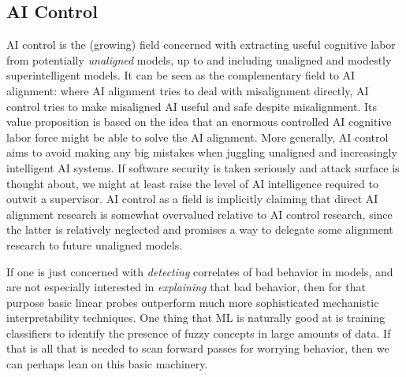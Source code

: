 \subsection{AI Control}
AI control \cite{greenblatt2024aicontrol} is the (growing) field concerned with
extracting useful cognitive labor from potentially \emph{unaligned} models, up
to and including unaligned and modestly superintelligent models. It can be seen
as the complementary field to AI alignment: where AI alignment tries to deal
with misalignment directly, AI control tries to make misaligned AI useful and
safe despite misalignment. Its value proposition is based on the idea that an
enormous controlled AI cognitive labor force might be able to solve the AI
alignment. More generally, AI control aims to avoid making any big mistakes
when juggling unaligned and increasingly intelligent AI systems. If software
security is taken seriously and attack surface is thought about, we might at
least raise the level of AI intelligence required to outwit a supervisor. AI
control as a field is implicitly claiming that direct AI alignment research is
somewhat overvalued relative to AI control research, since the latter is
relatively neglected and promises a way to delegate some alignment research to
future unaligned models.

If one is just concerned with \emph{detecting} correlates of bad behavior in
models, and are not especially interested in \emph{explaining} that bad
behavior, then for that purpose basic linear probes outperform much more
sophisticated mechanistic interpretability techniques. One thing that ML is
naturally good at is training classifiers to identify the presence of fuzzy
concepts in large amounts of data. If that is all that is needed to scan
forward passes for worrying behavior, then we can perhaps lean on this basic
machinery.

